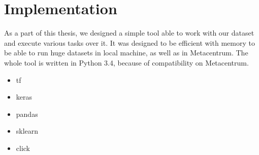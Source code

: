\chapter{Implementation}

As a part of this thesis, we designed a simple tool able to work with our dataset and execute various tasks over it. It was designed to be efficient with memory to be able to run huge datasets in local machine, as well as in Metacentrum. The whole tool is written in Python 3.4, because of compatibility on Metacentrum.

\begin{itemize}

\item tf
\item keras
\item pandas
\item sklearn
\item click

\end{itemize}